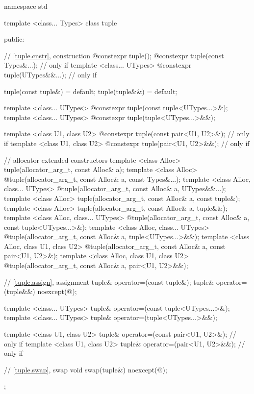 %
\begin{codeblock}
namespace std {
  template <class... Types>
  class tuple  {
  public:

    // \ref{tuple.cnstr},  construction
    @\EXPLICIT@ constexpr tuple();
    @\EXPLICIT@ constexpr tuple(const Types&...); // only if 
    template <class... UTypes>
      @\EXPLICIT@ constexpr tuple(UTypes&&...); // only if 

    tuple(const tuple&) = default;
    tuple(tuple&&) = default;

    template <class... UTypes>
      @\EXPLICIT@ constexpr tuple(const tuple<UTypes...>&);
    template <class... UTypes>
      @\EXPLICIT@ constexpr tuple(tuple<UTypes...>&&);

    template <class U1, class U2>
      @\EXPLICIT@ constexpr tuple(const pair<U1, U2>&);       // only if 
    template <class U1, class U2>
      @\EXPLICIT@ constexpr tuple(pair<U1, U2>&&);            // only if 

    // allocator-extended constructors
    template <class Alloc>
      tuple(allocator_arg_t, const Alloc& a);
    template <class Alloc>
      @\EXPLICIT@ tuple(allocator_arg_t, const Alloc& a, const Types&...);
    template <class Alloc, class... UTypes>
      @\EXPLICIT@ tuple(allocator_arg_t, const Alloc& a, UTypes&&...);
    template <class Alloc>
      tuple(allocator_arg_t, const Alloc& a, const tuple&);
    template <class Alloc>
      tuple(allocator_arg_t, const Alloc& a, tuple&&);
    template <class Alloc, class... UTypes>
      @\EXPLICIT@ tuple(allocator_arg_t, const Alloc& a, const tuple<UTypes...>&);
    template <class Alloc, class... UTypes>
      @\EXPLICIT@ tuple(allocator_arg_t, const Alloc& a, tuple<UTypes...>&&);
    template <class Alloc, class U1, class U2>
      @\EXPLICIT@ tuple(allocator_arg_t, const Alloc& a, const pair<U1, U2>&);
    template <class Alloc, class U1, class U2>
      @\EXPLICIT@ tuple(allocator_arg_t, const Alloc& a, pair<U1, U2>&&);

    // \ref{tuple.assign},  assignment
    tuple& operator=(const tuple&);
    tuple& operator=(tuple&&) noexcept(@\seebelow@);

    template <class... UTypes>
      tuple& operator=(const tuple<UTypes...>&);
    template <class... UTypes>
      tuple& operator=(tuple<UTypes...>&&);

    template <class U1, class U2>
      tuple& operator=(const pair<U1, U2>&);    // only if 
    template <class U1, class U2>
      tuple& operator=(pair<U1, U2>&&);         // only if 

    // \ref{tuple.swap},  swap
    void swap(tuple&) noexcept(@\seebelow@);
  };
}
\end{codeblock}

